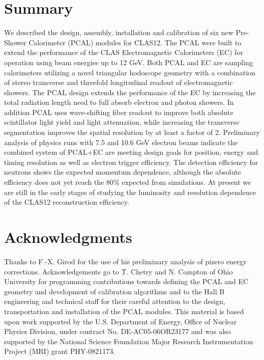 \section{Summary}
We described the design, assembly, installation and calibration of six new Pre-Shower Calorimeter (PCAL) modules for CLAS12.  The PCAL were built to extend the performance of the CLAS Electromagnetic Calorimeters (EC) for operation using beam energies up to 12 GeV.  Both PCAL and EC are sampling calorimeters utilizing a novel triangular hodoscope geometry with a combination of stereo transverse and threefold longitudinal readout of electromagnetic showers.  The PCAL design extends the performance of the EC by increasing the total radiation length need to full absorb electron and photon showers.  In addition PCAL uses wave-shifting fiber readout to improve both absolute scintillator light yield and light attenuation, while increasing the transverse segmentation improves the spatial resolution by at least a factor of 2.    Preliminary analysis of physics runs with 7.5 and 10.6 GeV electron beams indicate the combined system of PCAL+EC are meeting design goals for position, energy and timing resolution as well as electron trigger efficiency.  The detection efficiency for neutrons shows the expected momentum dependence, although the absolute efficiency does not yet reach the 80$\%$ expected from simulations.  At present we are still in the early stages of studying the luminosity and resolution dependence of the CLAS12 reconstruction efficiency.

\section*{Acknowledgments}

Thanks to F.-X. Girod for the use of his preliminary analysis of pizero energy corrections.  Acknowledgements go to T. Chetry and N. Compton of Ohio University for programming contributions towards defining the PCAL and EC geometry and development of  calibration algorithms and to the Hall B engineering and technical staff for their careful attention to the design, transportation and installation of the PCAL modules.
This material is based upon work supported by the U.S. Department of Energy, Office of Nuclear Physics Division, under contract No. DE-AC05-06OR23177 and was also supported by the National Science Foundation Major Research Instrumentation Project (MRI) grant PHY-0821173.





